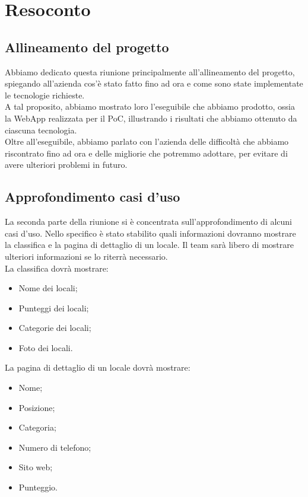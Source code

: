 \section{Resoconto}


\subsection{Allineamento del progetto}

Abbiamo dedicato questa riunione principalmente all'allineamento del progetto, spiegando all'azienda cos'è stato fatto fino ad ora e come sono state implementate le tecnologie richieste. \\
A tal proposito, abbiamo mostrato loro l'eseguibile che abbiamo prodotto, ossia la WebApp realizzata per il PoC, illustrando i risultati che abbiamo ottenuto da ciascuna tecnologia. \\

Oltre all'eseguibile, abbiamo parlato con l'azienda delle difficoltà che abbiamo riscontrato fino ad ora e delle migliorie che potremmo adottare, per evitare di avere ulteriori problemi in futuro. 

\subsection{Approfondimento casi d'uso}

La seconda parte della riunione si è concentrata sull'approfondimento di alcuni casi d'uso. Nello specifico è stato stabilito quali informazioni dovranno mostrare la classifica e la pagina di dettaglio di un locale. Il team sarà libero di mostrare ulteriori informazioni se lo riterrà necessario. \\
La classifica dovrà mostrare:
\begin{itemize}
	\item Nome dei locali;
	\item Punteggi dei locali;
	\item Categorie dei locali;
	\item Foto dei locali.
\end{itemize}
La pagina di dettaglio di un locale dovrà mostrare:
\begin{itemize}
	\item Nome;
	\item Posizione;
	\item Categoria;
	\item Numero di telefono;
	\item Sito web;
	\item Punteggio.
\end{itemize}




